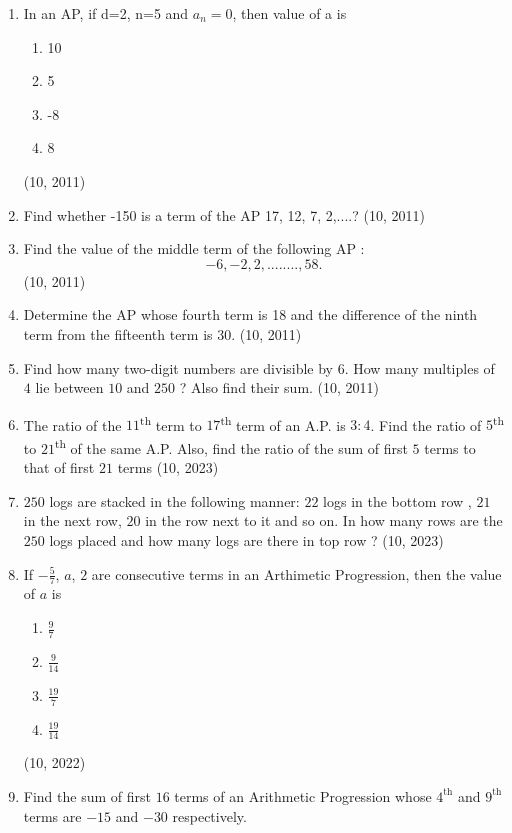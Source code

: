 \begin{enumerate}[label=\thesubsection.\arabic*,ref=\thesubsection.\theenumi,itemsep=1pt]
 \item In an AP, if d=2, n=5 and $a_n=0$, then value of a is
    \begin{enumerate}
         \item 10
         \item 5
         \item -8
         \item 8
    \end{enumerate}
    \hfill (10,  2011) \item Find whether -150 is a term of the AP 17, 12, 7, 2,....?
    \hfill (10,  2011) \item Find the value of the middle term of the following AP :\[- 6, -2, 2,........, 58.\]
   \hfill (10,  2011) \item Determine the AP whose fourth term is 18 and the difference of the ninth term from the fifteenth term is 30.
\hfill (10,  2011) \item Find how many two-digit numbers are divisible by $6$.
 How many multiples of $4$ lie between $10$ and $250$ ? Also find their sum.
    \hfill (10,  2011)
         \item The ratio of the $11$\textsuperscript{th} term to $17$\textsuperscript{th} term of an A.P. is $3:4$. Find the ratio of $5$\textsuperscript{th} to $21$\textsuperscript{th} of the same A.P. Also, find the ratio of the sum of first $5$ terms to that of first $21$ terms
        \hfill (10,  2023) \item $250$ logs are stacked in the following manner:
        $22$ logs in the bottom row , $21$ in the next row, $20$ in the row next to it and so on. In how many rows are the $250$ logs placed and how many logs are there in top row ?
\hfill (10,  2023)
 \item If $-\frac{5}{7}$, $a$, $2$ are consecutive terms in an Arthimetic Progression, then the value of $a$ is 
    \begin{enumerate}
\item $\frac{9}{7}$
 \item $\frac{9}{14}$
 \item $\frac{19}{7}$
 \item $\frac{19}{14}$
    \end{enumerate}
    \hfill (10,  2022) \item Find the sum of first $16$ terms of an Arithmetic Progression whose $4^{\text{th}}$ and $9^{\text{th}}$ terms are $-15$ and $-30$ respectively.
    

\end{enumerate}
